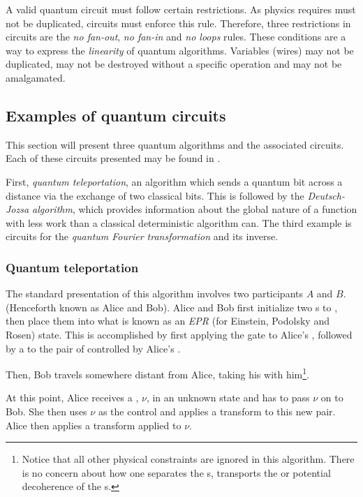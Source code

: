 A valid quantum circuit must follow certain restrictions. As physics requires
\qbits{} must not be duplicated, circuits must enforce this rule.
 Therefore, three restrictions in circuits are the \emph{no fan-out}, 
\emph{no fan-in} and \emph{no loops} rules. These conditions are  a
way to express the \emph{linearity} of quantum algorithms. Variables (wires)
may not be duplicated, may not be destroyed without a specific
operation and may not be amalgamated.


\subsection{Examples of quantum circuits}\label{subsec:exampleQuantumCircuits}
This section will present three quantum algorithms
and the associated circuits. 
Each of these circuits presented may be found  in \cite{neilsen2000:QuantumComputationAndInfo}.

First, \emph{quantum teleportation}, an algorithm which sends a quantum bit
 across a distance via the exchange of two classical bits. This is
followed by the \emph{Deutsch-Jozsa algorithm}, 
which provides information about the 
global nature of a function with less work than a classical deterministic 
algorithm can. The third example is  circuits for the 
\emph{quantum Fourier transformation} and its inverse.

\subsubsection{Quantum teleportation}\label{subsubsec:quantumTeleportation}
The standard presentation of this algorithm involves two 
participants $A$ and $B$. 
(Henceforth known as Alice and Bob). Alice and Bob first 
initialize two \qbit{}s
to , then place them into what is known
 as an \emph{EPR} (for Einstein, 
Podolsky and Rosen) state. This is accomplished by first applying the \Had{} 
gate to Alice's \qbit{}, followed by a \Cnot{} to the pair of \qbits{}
 controlled
by Alice's \qbit{}.

Then, Bob travels somewhere distant from Alice, taking his \qbit{} with 
him\footnote{Notice that all other physical constraints are ignored in this 
algorithm. There is no concern about how one separates the \qbit{}s, transports
the \qbit{} or potential decoherence of the \qbit{}s.}.

At this point,  Alice receives a 
 \qbit{}, $\nu$,  in an unknown state and has to  pass $\nu$
 on to Bob. She then uses $\nu$ as  the control and applies a
{\Cnot{}} transform to this new pair. Alice then applies a \Had{}
transform applied to $\nu$.

